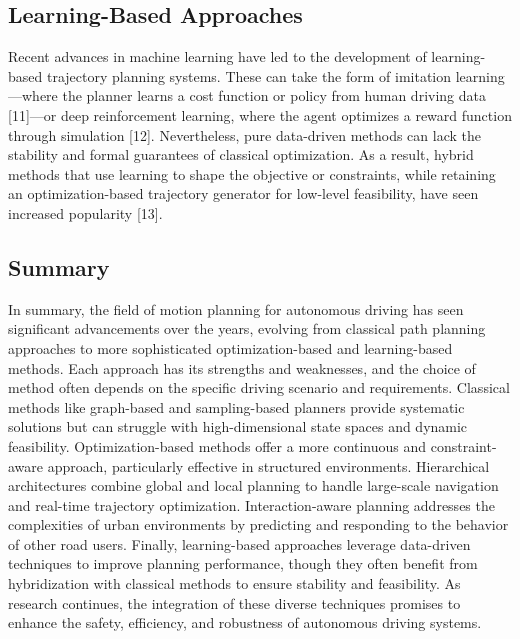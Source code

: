 \subsection{Learning-Based Approaches}
Recent advances in machine learning have led to the development of learning-based trajectory planning systems.
These can take the form of imitation learning—where the planner learns a cost function or policy from human driving data [11]—or deep reinforcement
learning, where the agent optimizes a reward function through simulation [12].
Nevertheless, pure data-driven methods can lack the stability and formal guarantees of classical optimization.
As a result, hybrid methods that use learning to shape the objective or constraints, while retaining an optimization-based trajectory generator for
low-level feasibility, have seen increased popularity [13].

\subsection{Summary}
In summary, the field of motion planning for autonomous driving has seen significant advancements over the years, evolving from classical path
planning approaches to more sophisticated optimization-based and learning-based methods.
Each approach has its strengths and weaknesses, and the choice of method often depends on the specific driving scenario and requirements.
Classical methods like graph-based and sampling-based planners provide systematic solutions but can struggle with high-dimensional state spaces and
dynamic feasibility.
Optimization-based methods offer a more continuous and constraint-aware approach, particularly effective in structured environments.
Hierarchical architectures combine global and local planning to handle large-scale navigation and real-time trajectory optimization.
Interaction-aware planning addresses the complexities of urban environments by predicting and responding to the behavior of other road users.
Finally, learning-based approaches leverage data-driven techniques to improve planning performance, though they often benefit from hybridization with
classical methods to ensure stability and feasibility.
As research continues, the integration of these diverse techniques promises to enhance the safety, efficiency, and robustness of autonomous driving
systems.
